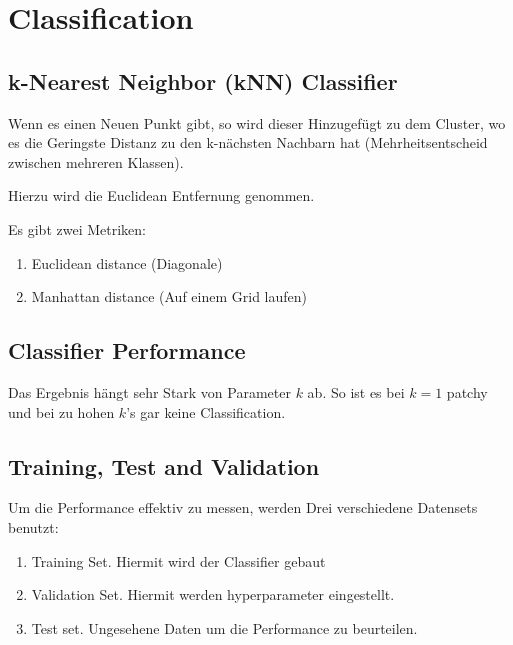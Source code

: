 \documentclass[a4paper]{article}
\title{\docTitle}
\author{Moritz}
\date{\today}
\begin{document}
\maketitle
\tableofcontents


\section{Classification}

\subsection{k-Nearest Neighbor (kNN) Classifier}

Wenn es einen Neuen Punkt gibt, so wird dieser Hinzugefügt zu dem Cluster, wo es die Geringste Distanz zu den k-nächsten Nachbarn hat (Mehrheitsentscheid zwischen mehreren Klassen). 

Hierzu wird die Euclidean Entfernung genommen.

Es gibt zwei Metriken:

\begin{enumerate}
    \item Euclidean distance (Diagonale)
    \item Manhattan distance (Auf einem Grid laufen)
\end{enumerate}

\subsection{Classifier Performance}

Das Ergebnis hängt sehr Stark von Parameter $k$ ab. So ist es bei $k=1$ patchy und bei zu hohen $k$'s gar keine Classification.

\subsection{Training, Test and Validation}

Um die Performance effektiv zu messen, werden Drei verschiedene Datensets benutzt:

\begin{enumerate}
    \item Training Set. Hiermit wird der Classifier gebaut
    \item Validation Set. Hiermit werden hyperparameter eingestellt.
    \item Test set. Ungesehene Daten um die Performance zu beurteilen.
\end{enumerate}
\end{document}
